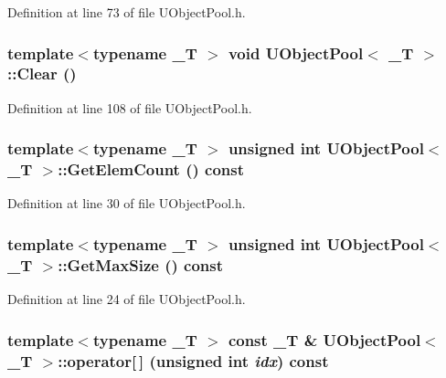 Definition at line 73 of file UObjectPool.h.\hypertarget{class_u_object_pool_3ae271d5b90ef0dcc678f35cfb4e41e0}{
\subsubsection[{Clear}]{\setlength{\rightskip}{0pt plus 5cm}template$<$typename \_\-T $>$ void {\bf UObjectPool}$<$ \_\-T $>$::Clear ()}}
\label{class_u_object_pool_3ae271d5b90ef0dcc678f35cfb4e41e0}




Definition at line 108 of file UObjectPool.h.\hypertarget{class_u_object_pool_104b7acdc7af85dd670a32dda060f218}{
\subsubsection[{GetElemCount}]{\setlength{\rightskip}{0pt plus 5cm}template$<$typename \_\-T $>$ unsigned int {\bf UObjectPool}$<$ \_\-T $>$::GetElemCount () const}}
\label{class_u_object_pool_104b7acdc7af85dd670a32dda060f218}




Definition at line 30 of file UObjectPool.h.\hypertarget{class_u_object_pool_92c0aee06f904b8e7cccbde28ff2d6db}{
\subsubsection[{GetMaxSize}]{\setlength{\rightskip}{0pt plus 5cm}template$<$typename \_\-T $>$ unsigned int {\bf UObjectPool}$<$ \_\-T $>$::GetMaxSize () const}}
\label{class_u_object_pool_92c0aee06f904b8e7cccbde28ff2d6db}




Definition at line 24 of file UObjectPool.h.\hypertarget{class_u_object_pool_f7cb9d7a1acc4f58bdb05f47cdbb2129}{
\subsubsection[{operator[]}]{\setlength{\rightskip}{0pt plus 5cm}template$<$typename \_\-T $>$ const \_\-T \& {\bf UObjectPool}$<$ \_\-T $>$::operator\mbox{[}$\,$\mbox{]} (unsigned int {\em idx}) const}}
\label{class_u_object_pool_f7cb9d7a1acc4f58bdb05f47cdbb2129}




